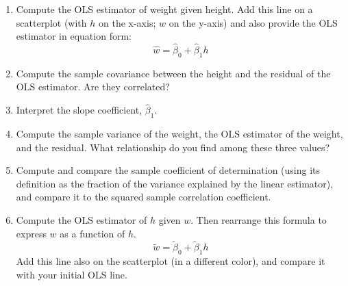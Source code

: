 \documentclass[12pt,twoside]{article}
\begin{document}
\begin{enumerate}
\begin{enumerate}
	\item Compute the OLS estimator of weight given height. Add this line on a scatterplot (with $h$ on the x-axis; $w$ on the y-axis) and also provide the OLS estimator in equation form:
\[
\hat{w} = \hat{\beta}_0 + \hat{\beta}_1 h
\]


	\item Compute the sample covariance between the height and the residual of the OLS estimator. Are they correlated?
    \item Interpret the slope coefficient, $\hat{\beta}_1$.	
	\item Compute the sample variance of the weight, the OLS estimator of the weight, and the residual. What relationship do you find among these three values?
	\item Compute and compare the sample coefficient of determination (using its definition as the fraction of the variance explained by the linear estimator), and compare it to the squared sample correlation coefficient.
	\item Compute the OLS estimator of \(h\) given \(w\). Then rearrange this formula to express \(w\) as a function of \(h\).
\[
\tilde{w} = \tilde{\beta}_0 + \tilde{\beta}_1 h
\]	
	 Add this line also on the scatterplot (in a different color), and compare it with your initial OLS line.
\end{enumerate}


\end{enumerate}
\end{document}
